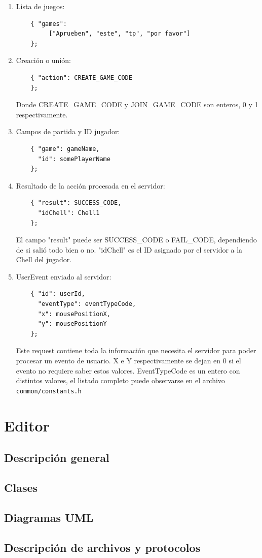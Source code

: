 \documentclass[a4paper]{article}
\begin{document}
\begin{enumerate}
	\item Lista de juegos:
	\begin{verbatim}
	{ "games":
		 ["Aprueben", "este", "tp", "por favor"]
	};
	\end{verbatim}
	\item Creación o unión:
	\begin{verbatim}
	{ "action": CREATE_GAME_CODE
	};
	\end{verbatim}
	Donde CREATE\_GAME\_CODE y JOIN\_GAME\_CODE son enteros, 0 y 1 respectivamente.
	\item Campos de partida y ID jugador:
	\begin{verbatim}
	{ "game": gameName,
	  "id": somePlayerName
	};
	\end{verbatim}
	\item Resultado de la acción procesada en el servidor:
	\begin{verbatim}
	{ "result": SUCCESS_CODE,
	  "idChell": Chell1
	};
	\end{verbatim}
	El campo "result" puede ser SUCCESS\_CODE o FAIL\_CODE, dependiendo de si salió todo bien o no. "idChell" es el ID asignado por el servidor a la Chell del jugador.
	\item UserEvent enviado al servidor:
	\begin{verbatim}
	{ "id": userId,
	  "eventType": eventTypeCode,
	  "x": mousePositionX,
	  "y": mousePositionY
	};
	\end{verbatim}
	Este request contiene toda la información que necesita el servidor para poder procesar un evento de usuario. X e Y respectivamente se dejan en 0 si el evento no requiere saber estos valores.
	EventTypeCode es un entero con distintos valores, el listado completo puede observarse en el archivo \texttt{common/constants.h}
\end{enumerate}

\section{Editor}

\subsection{Descripción general}

\subsection{Clases}

\subsection{Diagramas UML}

\subsection{Descripción de archivos y protocolos}
\end{document}

